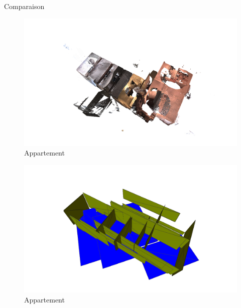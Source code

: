 \documentclass[11pt]{beamer}
\begin{document}
\begin{frame}{Comparaison}
\begin{multicols}{2}
\begin{figure}[hbtp]
\centering
\includegraphics[width=1.3\columnwidth]{appart01.png}
\caption{Appartement}
\end{figure}

\columnbreak
\begin{figure}[hbtp]
\centering
\includegraphics[width=1.3\columnwidth]{appart04.png}
\caption{Appartement}
\end{figure}

\end{multicols}
\end{frame}
\end{document}
